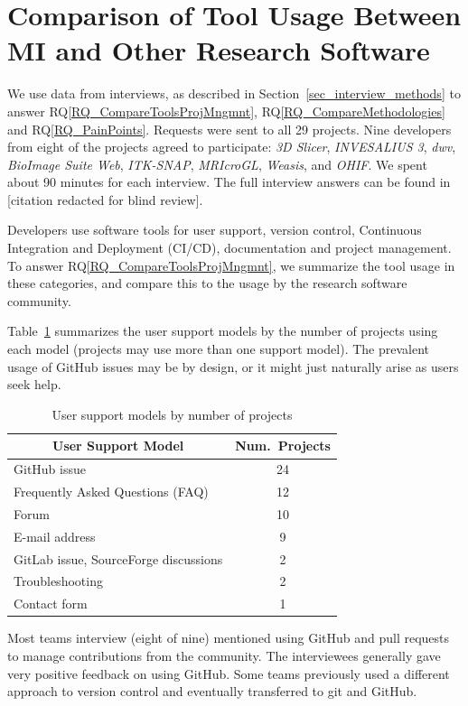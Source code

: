 \documentclass[final, 12pt, 3p, times]{elsarticle}
\newcommand{\rqref}[1]{RQ\ref{#1}}
\begin{document}
\section{Comparison of Tool Usage Between MI and Other Research Software}
\label{Sec_CompareTools}

We use data from interviews, as described in Section~\ref{sec_interview_methods}
to answer \rqref{RQ_CompareToolsProjMngmnt}, \rqref{RQ_CompareMethodologies}
and \rqref{RQ_PainPoints}. Requests were sent to all 29 projects.  Nine
developers from eight of the projects agreed to participate: \textit{3D Slicer},
\textit{INVESALIUS 3}, \textit{dwv}, \textit{BioImage Suite Web},
\textit{ITK-SNAP}, \textit{MRIcroGL}, \textit{Weasis}, and \textit{OHIF}. We
spent about 90 minutes for each interview. The full interview answers can be
found in [citation redacted for blind review].

Developers use software tools for user support, version control, Continuous
Integration and Deployment (CI/CD), documentation and project management. To
answer \rqref{RQ_CompareToolsProjMngmnt}, we summarize the tool usage in these
categories, and compare this to the usage by the research software community.

Table~\ref{tab_user_support_model} summarizes the user support models by the
number of projects using each model (projects may use more than one support
model). The prevalent usage of GitHub issues may be by design, or it might just
naturally arise as users seek help.

\begin{table}[!ht]
\centering
\begin{tabular}{lc}
\toprule
\multicolumn{1}{c}{User Support Model} & Num.\ Projects \\
\midrule
GitHub issue & 24 \\
Frequently Asked Questions (FAQ) & 12 \\
Forum & 10 \\
E-mail address & 9 \\
GitLab issue, SourceForge discussions & 2 \\
Troubleshooting & 2 \\
Contact form & 1 \\ 
\bottomrule
\end{tabular}
\caption{\label{tab_user_support_model}User support models by number of projects}
\end{table}

Most teams interview (eight of nine) mentioned using GitHub and pull requests to manage
contributions from the community. The interviewees generally gave very positive
feedback on using GitHub. Some teams previously used a different approach to
version control and eventually transferred to git and GitHub.
\end{document}
